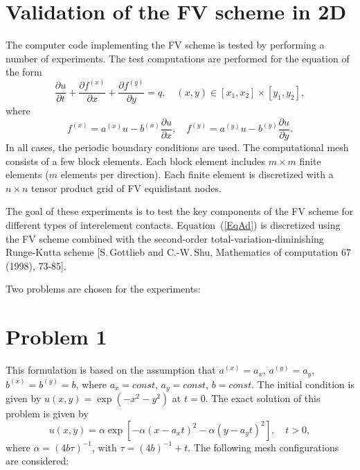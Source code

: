 \documentclass[fleqn]{article}
\begin{document}
\section*{Validation of the FV scheme in 2D}
The computer code implementing the FV scheme is tested by performing a number of experiments. The test computations are performed for the equation of the form
\begin{equation}
\label{EqAd}
\frac{\partial u}{\partial t}+\frac{\partial f^{(x)}}{\partial x}+\frac{\partial f^{(y)}}{\partial y}=q, \quad (x,y) \in [x_{1},x_{2}] \times [y_{1},y_{2}],
\end{equation}
where
\begin{equation}
f^{(x)}=a^{(x)}u-b^{(x)}\frac{\partial u}{\partial x}, \quad
f^{(y)}=a^{(y)}u-b^{(y)}\frac{\partial u}{\partial y}.
\end{equation}
In all cases, the periodic boundary conditions are used. The computational mesh consists of a few block elements. Each block element includes $m \times m$ finite elements ($m$ elements per direction). Each finite element is discretized with a $n \times n$ tensor product grid of FV equidistant nodes.

The goal of these experiments is to test the key components of the FV scheme for different types of interelement contacts. Equation~(\ref{EqAd}) is discretized using the FV scheme combined with the second-order total-variation-diminishing Runge-Kutta scheme [S.\,Gottlieb and C.-W.\,Shu, Mathematics of computation 67 (1998), 73-85].

Two problems are chosen for the experiments:
\section{Problem 1}
This formulation is based on the assumption that $a^{(x)} = a_{x}$, $a^{(y)}=a_{y}$, $b^{(x)}=b^{(y)}=b$, where $a_{x}=const$, $a_{y}=const$, $b=const$.  The initial condition is given by $u(x,y)=\exp (-x^{2}-y^{2} )$ at $t=0$.  The exact solution of this problem is given by
\begin{displaymath}
u(x,y)=\alpha \exp\left[-\alpha \left(x-a_{x}t\right)^{2}-\alpha \left(y-a_{y}t\right)^{2} \right], \quad t>0,
\end{displaymath}
where $\alpha=(4 b \tau)^{-1}$, with $\tau=(4b)^{-1}+t$.  The following mesh configurations are considered: \\
\end{document}
